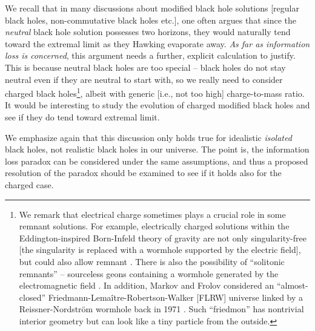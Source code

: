 \documentclass[12pt]{article}
\newcommand{\2}{$^2$}
\newcommand{\3}{$^3$}
\newcommand{\4}{$_4$}
\newcommand{\5}{$_5$}
\begin{document}
We recall that in many discussions about modified black hole solutions [regular black holes, non-commutative black holes etc.], one often argues that since the \emph{neutral} black hole solution possesses two horizons, they would naturally tend toward the extremal limit as they Hawking evaporate away. 
\emph{As far as information loss is concerned}, this argument needs a further, explicit calculation to justify. This is because neutral black holes are too special -- black holes do not stay neutral even if they are neutral to start with, so we really need to consider charged black holes\footnote{We remark that
electrical charge sometimes plays a crucial role in some remnant solutions. For example, 
electrically charged solutions within the Eddington-inspired Born-Infeld theory of gravity are not only singularity-free [the singularity is replaced with a wormhole supported by the electric field], but could also allow remnant \cite{1311.0815}. There is also the possibility of ``solitonic remnants'' -- sourceless geons containing a wormhole generated by the electromagnetic field \cite{1306.2504}. In addition, Markov and Frolov considered an ``almost-closed'' Friedmann-Lema\^itre-Robertson-Walker [FLRW] universe linked by a Reissner-Nordstr\"om wormhole back in 1971 \cite{MM0}. Such ``friedmon'' has nontrivial interior geometry but can look like a tiny particle from the outside.}, albeit with generic [i.e., not too high] charge-to-mass ratio. It would be interesting to study the evolution of charged modified black holes and see if they do tend toward extremal limit.  

We emphasize again that this discussion only holds true for idealistic \emph{isolated} black holes, not realistic black holes in our universe. The point is, the information loss paradox can be considered under the same assumptions, and thus a proposed resolution of the paradox should be examined to see if it holds also for the charged case. 
\end{document}

